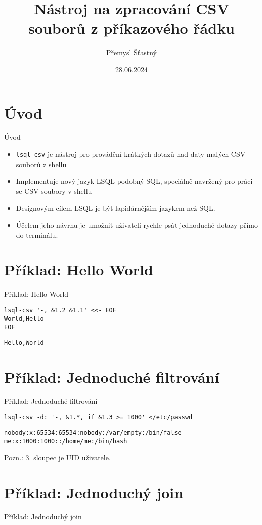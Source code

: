 \documentclass{beamer}
\title[Nástroj \icode{lsql-csv} na zpracování CSV souborů z příkazového řádku]{Nástroj \icode{lsql-csv} na zpracování CSV souborů z příkazového řádku}
\author{Přemysl Šťastný}
\institute{Univerzita Karlova}
\date{28.06.2024}
\def\icode#1{\texttt{#1}}
\begin{document}
\begin{frame}
  \titlepage
\end{frame}


\section{Úvod}

\begin{frame}{Úvod}

\begin{itemize}
  \item \icode{lsql-csv} je nástroj pro provádění krátkých dotazů nad daty malých CSV souborů z shellu
  \item Implementuje nový jazyk LSQL podobný SQL, speciálně navržený pro práci se CSV soubory v shellu
  \item Designovým cílem LSQL je být lapidárnějším jazykem než SQL. 
  \item Účelem jeho návrhu je umožnit uživateli rychle psát jednoduché dotazy přímo do terminálu.
\end{itemize}


\end{frame}


\section{Příklad: Hello World}

\begin{frame}[fragile]{Příklad: Hello World}

\begin{verbatim}
lsql-csv '-, &1.2 &1.1' <<- EOF
World,Hello
EOF
\end{verbatim}

\begin{verbatim}
Hello,World
\end{verbatim}

\end{frame}

\section{Příklad: Jednoduché filtrování}
\begin{frame}[fragile]{Příklad: Jednoduché filtrování}

\begin{verbatim}
lsql-csv -d: '-, &1.*, if &1.3 >= 1000' </etc/passwd
\end{verbatim}

\begin{verbatim}
nobody:x:65534:65534:nobody:/var/empty:/bin/false
me:x:1000:1000::/home/me:/bin/bash
\end{verbatim}

\vskip 1cm

Pozn.: 3. sloupec je UID uživatele.

\end{frame}


\section{Příklad: Jednoduchý join}
\begin{frame}[fragile]{Příklad: Jednoduchý join}
\end{frame}
\end{document}
